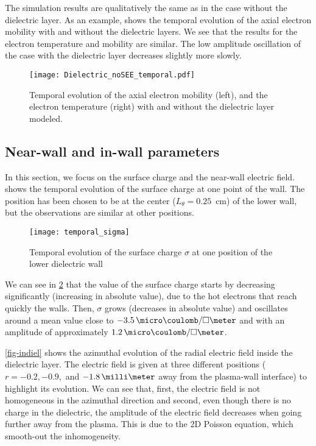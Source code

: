   
  The simulation results are qualitatively the same as in the case without the dielectric layer.
  As an example,  shows the temporal evolution of the axial electron mobility with and without the dielectric layers.
  We see that the results for the electron temperature and mobility are similar.
  The low amplitude oscillation of the case with the dielectric layer decreases slightly more slowly.
  
  \begin{figure}[hbt]
    \centering
    \texttt{[image: Dielectric\_noSEE\_temporal.pdf]}
    \caption{Temporal evolution of the axial electron mobility (left), and the electron temperature (right) with and without the dielectric layer modeled.}
    \label{fig-mod_diel_comp}
  \end{figure}

  
  \subsection{Near-wall and in-wall parameters} \label{subsec-nearwall}
    In this section, we focus on the surface charge and the near-wall electric field.
     shows the temporal evolution of the surface charge at one point of the wall.
    The position has been chosen to be at the center ($L_{\theta} = 0.25$~cm) of the lower wall, but the observations are similar at other positions.
     
    \begin{figure}[!hbt]
      \centering
      \texttt{[image: temporal\_sigma]}
      \caption{Temporal evolution of the surface charge $\sigma$ at one position of the lower dielectric wall}
      \label{fig-sigma_time}
    \end{figure}

    We can see in \cref{fig-sigma_time} that the value of the surface charge starts by decreasing significantly (increasing in absolute value), due to the hot electrons that reach quickly the walls.
    Then, $\sigma$ grows (decreases in absolute value) and oscillates around a mean value close to $-3.5 \,\micro\coulomb/\square\meter$ and with an amplitude of approximately $1.2 \,\micro\coulomb/\square\meter$.
    
    \cref{fig-indiel} shows the azimuthal evolution of the radial electric field inside the dielectric layer.
    The electric field is given at three different positions ($r=-0.2, -0.9,$ and $-1.8\,\milli\meter$ away from the plasma-wall interface) to highlight its evolution.
    We can see that, first, the electric field is not homogeneous in the azimuthal direction and second, even though there is no charge in the dielectric, the amplitude of the electric field decreases when going further away from the plasma.
    This is due to the \ac{2D} Poisson equation, which smooth-out the inhomogeneity.
     
